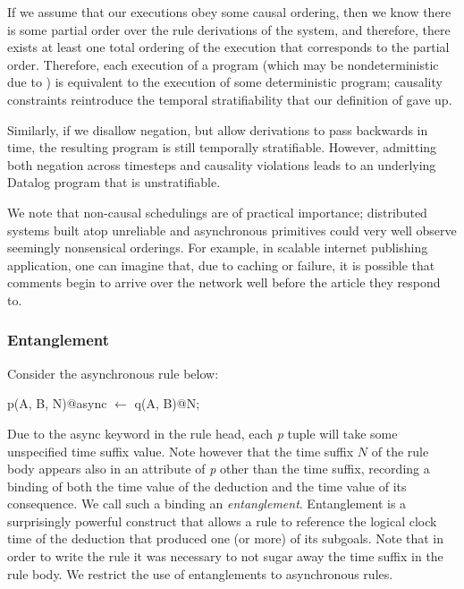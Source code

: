 %

If we assume that our executions obey some causal ordering, then we
know there is some partial order over the rule derivations of the
system, and therefore, there exists at least one total ordering of the
execution that corresponds to the partial order.  Therefore, each
execution of a \lang program (which may be nondeterministic due to
) is equivalent to the execution of some deterministic \slang
program; causality constraints reintroduce the temporal stratifiability
that our definition of \lang gave up.

Similarly, if we disallow negation, but allow derivations to pass
backwards in time, the resulting \lang program is still temporally
stratifiable.  However, admitting both negation across timesteps and
causality violations leads to an underlying Datalog program that is
unstratifiable.

We note that non-causal schedulings are of practical importance;
distributed systems built atop unreliable and asynchronous primitives
could very well observe seemingly nonsensical orderings.  For example,
in scalable internet publishing application, one can imagine that, due
to caching or failure, it is possible that comments begin to arrive
over the network well before the article they respond to.

\subsubsection{Entanglement}

Consider the asynchronous rule below:

\begin{Dedalus}
p(A, B, N)@async \(\leftarrow\)
  q(A, B)@N;
\end{Dedalus}

Due to the async keyword in the rule head, each \emph{p} tuple will take some unspecified time suffix value.
Note however that the time suffix $N$ of the rule body appears also in an attribute of \emph{p} other than the time suffix, recording a 
binding of both the time value of the deduction and the time value of its consequence.  We call such a binding
an \emph{entanglement}.   Entanglement is a surprisingly powerful construct that allows a rule to 
reference the logical clock time of the deduction that produced one (or more) of its subgoals.  Note that in order
to write the rule it was necessary to not sugar away the time suffix in the rule body.  We restrict the use of entanglements to asynchronous rules. 

